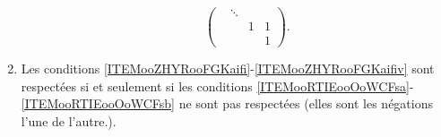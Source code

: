 \begin{theorem}
\begin{enumerate}
\begin{enumerate}
\begin{equation}
\begin{pmatrix}
                                &   \ddots    &       &       \\
                                &       &   1    &   1    \\ 
                                &       &       &   1     
                         \end{pmatrix}.
                    \end{equation}
            \end{enumerate}
            \let\theenumii\oldtheenumii
        \item
            Les conditions \ref{ITEMooZHYRooFGKaifi}-\ref{ITEMooZHYRooFGKaifiv} sont respectées si et seulement si les conditions \ref{ITEMooRTIEooOoWCFsa}-\ref{ITEMooRTIEooOoWCFsb} ne sont pas respectées (elles sont les négations l'une de l'autre.).
    \end{enumerate}
\end{theorem}

